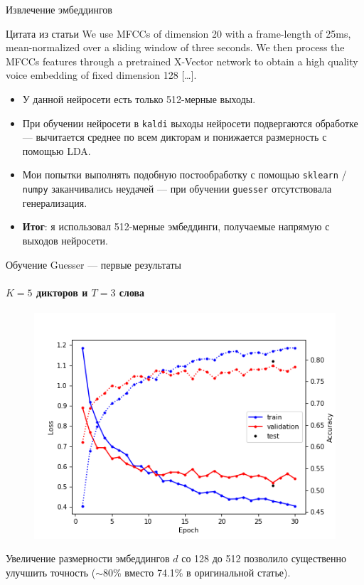 \documentclass{beamer}
\begin{document}
\begin{frame}{Извлечение эмбеддингов}
\begin{block}{Цитата из статьи}
    We use MFCCs of dimension 20 with a frame-length of 25ms, mean-normalized
    over a sliding window of three seconds. We then process the MFCCs features
    through a pretrained X-Vector network to obtain a high quality voice
    embedding of fixed dimension 128 [\ldots].
    \end{block}

    \begin{itemize}
        \item У данной нейросети есть только 512-мерные выходы.
        \item При обучении нейросети в \texttt{kaldi} выходы нейросети
              подвергаются обработке --- вычитается среднее по всем дикторам и
              понижается размерность с помощью LDA\@.
        \item Мои попытки выполнять подобную постообработку с помощью
              \texttt{sklearn} / \texttt{numpy} заканчивались неудачей --- при
              обучении \texttt{guesser} отсутствовала генерализация.
        \item \textbf{Итог}: я использовал 512-мерные эмбеддинги, получаемые
        напрямую с выходов нейросети.
    \end{itemize}
\end{frame}

\begin{frame}{Обучение Guesser --- первые результаты}
    \framesubtitle{$K = 5$ дикторов и $T = 3$ слова}
    \begin{figure}
        \centering
        \includegraphics[scale=0.4]{guesser_training_v1.png}
    \end{figure}

    Увеличение размерности эмбеддингов $d$ со 128 до 512 позволило существенно улучшить точность ($\sim$80\% вместо 74.1\% в оригинальной статье).
\end{frame}
\end{document}
